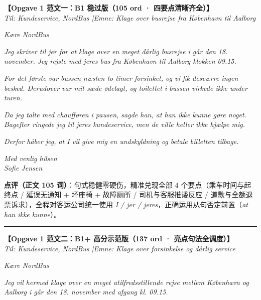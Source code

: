 \begin{answerbox}
\textbf{\color{NCDNavy}【Opgave 1 范文一：B1 稳过版（105 ord · 四要点清晰齐全）】}\\
\textit{Til: Kundeservice, NordBus \quad|\quad Emne: Klage over busrejse fra København til Aalborg}

\vspace{0.25em}
\textit{Kære NordBus}

\vspace{0.2em}
\textit{Jeg skriver til jer for at klage over en meget dårlig busrejse i går den 18. november. Jeg rejste med jeres bus fra København til Aalborg klokken 09.15.}

\vspace{0.2em}
\textit{For det første var bussen næsten to timer forsinket, og vi fik desværre ingen besked. Derudover var mit sæde ødelagt, og toilettet i bussen virkede ikke under turen.}

\vspace{0.2em}
\textit{Da jeg talte med chaufføren i pausen, sagde han, at han ikke kunne gøre noget. Bagefter ringede jeg til jeres kundeservice, men de ville heller ikke hjælpe mig.}

\vspace{0.2em}
\textit{Derfor håber jeg, at I vil give mig en undskyldning og betale billetten tilbage.}

\vspace{0.2em}
\textit{Med venlig hilsen\\
Sofie Jensen}

\vspace{0.25em}
\small\textbf{点评（正文 105 词）}：句式稳健零硬伤，精准兑现全部 4 个要点（乘车时间与起终点 / 延误无通知 + 坏座椅 + 故障厕所 / 司机与客服推诿反应 / 道歉与全额退票诉求），全程对客运公司统一使用 \textit{I / jer / jeres}，正确运用从句否定前置（\textit{at han ikke kunne}）。

\vspace{0.45em}
\hrule
\vspace{0.45em}

\textbf{\color{NCDRed}【Opgave 1 范文二：B1+ 高分示范版（137 ord · 亮点句法全调度）】}\\
\textit{Til: Kundeservice, NordBus \quad|\quad Emne: Klage over forsinkelse og dårlig service}

\vspace{0.25em}
\textit{Kære NordBus}

\vspace{0.2em}
\textit{Jeg vil hermed klage over en meget utilfredsstillende rejse mellem København og Aalborg i går den 18. november med afgang kl. 09.15.}


\end{answerbox}
